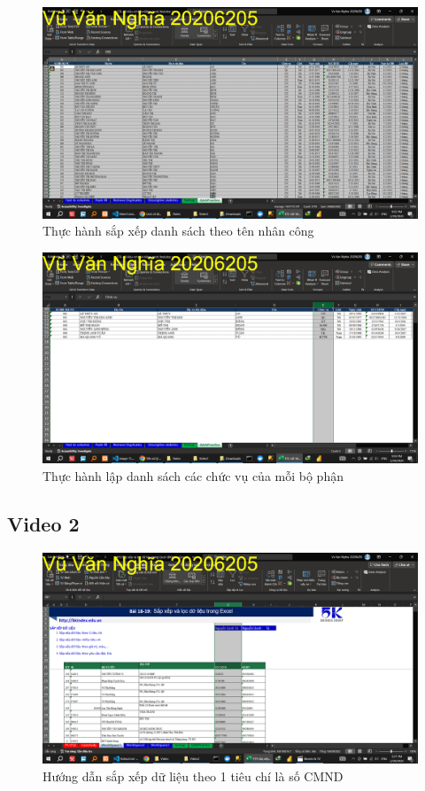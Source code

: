 \documentclass{article}
\begin{document}
\begin{figure}[H]
\centering
\includegraphics[scale = 0.15]{Video1/ThucHanh/5.png}
\caption{Thực hành sắp xếp danh sách theo tên nhân công}
\end{figure}

\begin{figure}[H]
\centering
\includegraphics[scale = 0.15]{Video1/ThucHanh/6.png}
\caption{Thực hành lập danh sách các chức vụ của mỗi bộ phận}
\end{figure}
\subsection{Video 2}
\begin{figure}[H]
\centering
\includegraphics[scale = 0.15]{Video2/HuongDan/0.png}
\caption{Hướng dẫn sắp xếp dữ liệu theo 1 tiêu chí là số CMND}
\end{figure}
\end{document}
